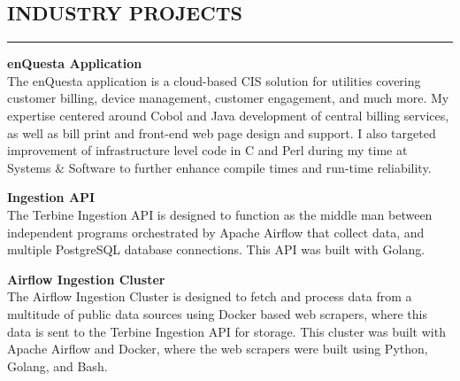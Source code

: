 \documentclass{res}
\begin{document}
\begin{resume}
        \begin{comment}
		{\bf Academic Success Center, UNLV} \hfill \emph{Summers of 2017, 2018, 2019} \\
			\emph{Team Lead}

			\begin{itemize} \itemsep -2pt
				\item Managed planning and presentation of lectures, bookkeeping, and dynamic of the ALEKS program
				\item Developed individual lesson plans based on statistical assessment of student performance
        \item Prepared and proctored ALEKS placement exam
			\end{itemize}
		\end{comment}

\vspace{-3pt}

		\section{{INDUSTRY PROJECTS}}
    \noindent\rule[0.5ex]{\linewidth}{1pt}        
		{\bf enQuesta Application} \hfill \vspace{5pt} \\
           The enQuesta application is a cloud-based CIS solution for utilities covering customer billing, device management, customer engagement, and much more. My expertise centered around Cobol and Java development of central billing services, as well as bill print and front-end web page design and support. I also targeted improvement of infrastructure level code in C and Perl during my time at Systems \& Software to further enhance compile times and run-time reliability.

\vspace{-5pt}
    
		{\bf Ingestion API} \hfill \vspace{5pt} \\
			The Terbine Ingestion API is designed to function as the middle man between independent programs orchestrated by Apache Airflow that collect data, and multiple PostgreSQL database connections. This API was built with Golang.
\vspace{-5pt}

		{\bf Airflow Ingestion Cluster} \hfill \vspace{5pt} \\
			The Airflow Ingestion Cluster is designed to fetch and process data from a multitude of public data sources using Docker based web scrapers, where this data is sent to the Terbine Ingestion API for storage. This cluster was built with Apache Airflow and Docker, where the web scrapers were built using Python, Golang, and Bash.
\vspace{-5pt}


\end{resume}
\end{document}
